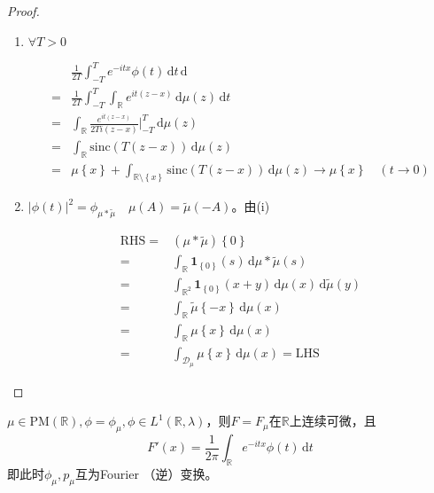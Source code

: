 \documentclass{ctexart}
\begin{document}
\begin{proof}
  
\begin{enumerate}
\item $\forall T>0$
  
\begin{align*}
  &\frac{1}{2T}\int_{-T}^{T} e^{-itx}\phi(t)\,\mathrm{d}t \,\mathrm{d}\\
  =&\frac{1}{2T}\int_{-T}^{T} \int_{\mathbb{R}}^{} e^{it(z-x)}  \,\mathrm{d}\mu(z) \,\mathrm{d}t\\
  =&\int_{\mathbb{R}}^{} \frac{e^{it(z-x)}}{2Ti(z-x)}|_{-T}^T  \,\mathrm{d}\mu(z)\\
  =&\int_{\mathbb{R}}^{} \mathrm{sinc}(T(z-x)) \,\mathrm{d}\mu(z)\\
  =&\mu \left\{ x \right\}+ \int_{\mathbb{R}\setminus \left\{ x \right\}}^{} \mathrm{sinc}(T(z-x))  \,\mathrm{d}\mu(z)\to \mu \left\{ x \right\} \quad (t\to 0)
\end{align*}
\item   
  $\left| \phi(t) \right|^2 = \phi_{\mu * \tilde{\mu}} \quad \mu(A)= \tilde{\mu}(-A)$。由(i)
  
\begin{align*}
  \mathrm{RHS}=& (\mu * \tilde{\mu})\left\{ 0 \right\}\\
  =&\int_{\mathbb{R}}^{} \mathbf{1}_{\left\{ 0 \right\}}(s)   \,\mathrm{d}\mu*\tilde{\mu}(s)\\
  =&\int_{\mathbb{R}^2} \mathbf{1}_{\left\{ 0 \right\}}(x+y) \,\mathrm{d} \mu(x)\,\mathrm{d} \tilde{\mu}(y)\\
  =& \int_{\mathbb{R}} \tilde{\mu}\left\{ -x \right\}\,\mathrm{d}\mu(x)\\
  =&\int_{\mathbb{R}}\mu \left\{ x \right\} \,\mathrm{d}\mu(x)\\
  =&\int_{\mathcal{D}_{\mu}}\mu \left\{ x \right\} \,\mathrm{d}\mu(x)= \mathrm{LHS}
\end{align*}
\end{enumerate}
\end{proof}

\begin{Cor}
  $\mu\in \mathrm{PM}(\mathbb{R}), \phi=\phi_{\mu}, \phi\in L^1(\mathbb{R}, \lambda)$，则$F=F_{\mu}$在$\mathbb{R}$上连续可微，且
  \begin{equation*}
F'(x)=\frac{1}{2\pi}\int_{\mathbb{R}}e^{-itx}\phi(t) \,\mathrm{d}t
\end{equation*}
即此时$\phi_{\mu}, p_{\mu}$互为Fourier （逆）变换。
\end{Cor}
\end{document}
